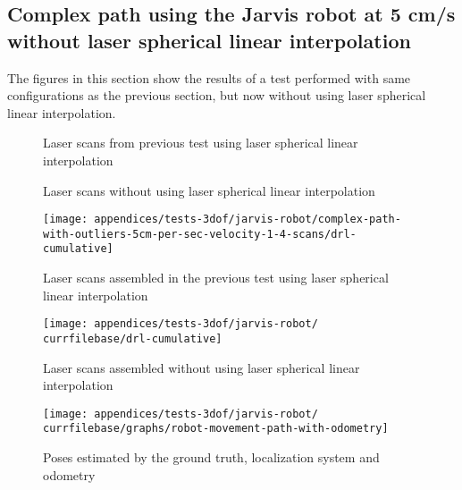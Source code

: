 \subsection{Complex path using the Jarvis robot at 5 cm/s without laser spherical linear interpolation}\label{subsec:appendix-a_jarvis-robot-tests_complex-path-using-the-jarvis-robot-at-5-cm-s-without-laser-spherical-linear-interpolation}

The figures in this section show the results of a test performed with same configurations as the previous section, but now without using laser spherical linear interpolation.


\begin{figure}[H]
	\centering
	\caption{Laser scans from previous test using laser spherical linear interpolation}
\end{figure}

\begin{figure}[H]
	\centering
	\caption{Laser scans without using laser spherical linear interpolation}
\end{figure}


\begin{figure}[H]
	\centering
	\texttt{[image: appendices/tests-3dof/jarvis-robot/complex-path-with-outliers-5cm-per-sec-velocity-1-4-scans/drl-cumulative]}
	\caption{Laser scans assembled in the previous test using laser spherical linear interpolation}
\end{figure}

\begin{figure}[H]
	\centering
	\texttt{[image: appendices/tests-3dof/jarvis-robot/\\currfilebase/drl-cumulative]}
	\caption{Laser scans assembled without using laser spherical linear interpolation}
\end{figure}



\begin{figure}[H]
	\centering
	\texttt{[image: appendices/tests-3dof/jarvis-robot/\\currfilebase/graphs/robot-movement-path-with-odometry]}
	\caption{Poses estimated by the ground truth, localization system and odometry}
\end{figure}

